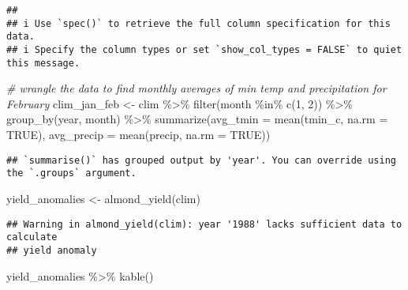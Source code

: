\documentclass[
]{article}
\newenvironment{Shaded}{\begin{snugshade}}{\end{snugshade}}
\newcommand{\AttributeTok}[1]{\textcolor[rgb]{0.77,0.63,0.00}{#1}}
\newcommand{\CommentTok}[1]{\textcolor[rgb]{0.56,0.35,0.01}{\textit{#1}}}
\newcommand{\ConstantTok}[1]{\textcolor[rgb]{0.00,0.00,0.00}{#1}}
\newcommand{\DecValTok}[1]{\textcolor[rgb]{0.00,0.00,0.81}{#1}}
\newcommand{\FunctionTok}[1]{\textcolor[rgb]{0.00,0.00,0.00}{#1}}
\newcommand{\NormalTok}[1]{#1}
\newcommand{\OtherTok}[1]{\textcolor[rgb]{0.56,0.35,0.01}{#1}}
\newcommand{\SpecialCharTok}[1]{\textcolor[rgb]{0.00,0.00,0.00}{#1}}
\begin{document}
\begin{verbatim}
## 
## i Use `spec()` to retrieve the full column specification for this data.
## i Specify the column types or set `show_col_types = FALSE` to quiet this message.
\end{verbatim}

\begin{Shaded}
\begin{Highlighting}[]
\CommentTok{\# wrangle the data to find monthly averages of min temp and precipitation for February}
\NormalTok{clim\_jan\_feb }\OtherTok{\textless{}{-}}\NormalTok{ clim }\SpecialCharTok{\%\textgreater{}\%} 
  \FunctionTok{filter}\NormalTok{(month }\SpecialCharTok{\%in\%} \FunctionTok{c}\NormalTok{(}\DecValTok{1}\NormalTok{, }\DecValTok{2}\NormalTok{)) }\SpecialCharTok{\%\textgreater{}\%} 
  \FunctionTok{group\_by}\NormalTok{(year, month) }\SpecialCharTok{\%\textgreater{}\%} 
  \FunctionTok{summarize}\NormalTok{(}\AttributeTok{avg\_tmin =} \FunctionTok{mean}\NormalTok{(tmin\_c, }\AttributeTok{na.rm =} \ConstantTok{TRUE}\NormalTok{),}
            \AttributeTok{avg\_precip =} \FunctionTok{mean}\NormalTok{(precip, }\AttributeTok{na.rm =} \ConstantTok{TRUE}\NormalTok{))}
\end{Highlighting}
\end{Shaded}

\begin{verbatim}
## `summarise()` has grouped output by 'year'. You can override using the `.groups` argument.
\end{verbatim}

\begin{Shaded}
\begin{Highlighting}[]
\NormalTok{yield\_anomalies }\OtherTok{\textless{}{-}} \FunctionTok{almond\_yield}\NormalTok{(clim)}
\end{Highlighting}
\end{Shaded}

\begin{verbatim}
## Warning in almond_yield(clim): year '1988' lacks sufficient data to calculate
## yield anomaly
\end{verbatim}

\begin{Shaded}
\begin{Highlighting}[]
\NormalTok{yield\_anomalies }\SpecialCharTok{\%\textgreater{}\%} \FunctionTok{kable}\NormalTok{()}
\end{Highlighting}
\end{Shaded}
\end{document}
